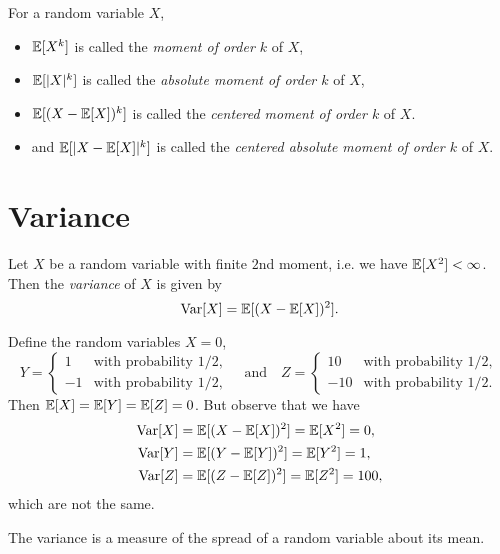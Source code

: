 \begin{definition}
  For a random variable $X$,
  \begin{itemize}
    \item $\mathbb{E}[X^k]$ is called the \emph{moment of order $k$} of $X$,
    \item $\mathbb{E}[|X|^k]$ is called the \emph{absolute moment of order $k$} of $X$,
    \item $\mathbb{E}[(X - \mathbb{E}[X])^k]$ is called the \emph{centered moment of order $k$} of $X$.
    \item and $\mathbb{E}[|X - \mathbb{E}[X]|^k]$ is called the \emph{centered absolute moment of order $k$} of $X$.
  \end{itemize}
\end{definition}

\section{Variance}
\begin{definition}
  Let $X$ be a random variable with finite
  $2$nd moment, i.e. we have $\mathbb{E}[X^2] < \infty$. Then
  the \emph{variance} of $X$ is given by
  \[
    \operatorname{Var}[X] = \mathbb{E}[(X - \mathbb{E}[X])^2].
  \]
\end{definition}

\begin{example}
  Define the random variables $X = 0$,
  \[
    Y =
    \begin{cases}
      1 & \text{with probability } 1 / 2, \\
      -1 & \text{with probability } 1 / 2,
    \end{cases}
    \quad \text{and} \quad
    Z =
    \begin{cases}
      10 & \text{with probability } 1 / 2, \\
      -10 & \text{with probability } 1 / 2.
    \end{cases}
  \]
  Then $\mathbb{E}[X] = \mathbb{E}[Y] = \mathbb{E}[Z] = 0$. But observe
  that we have
  \begin{align*}
    \operatorname{Var}[X] &= \mathbb{E}[(X - \mathbb{E}[X])^2] = \mathbb{E}[X^2] = 0, \\
    \operatorname{Var}[Y] &= \mathbb{E}[(Y - \mathbb{E}[Y])^2] = \mathbb{E}[Y^2] = 1, \\
    \operatorname{Var}[Z] &= \mathbb{E}[(Z - \mathbb{E}[Z])^2] = \mathbb{E}[Z^2] = 100,
  \end{align*}
  which are not the same.
\end{example}

\begin{remark}
  The variance is a measure of the spread of a
  random variable about its mean.
\end{remark}

